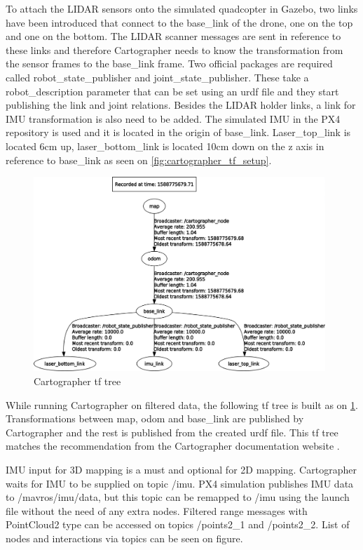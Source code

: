 To attach the LIDAR sensors onto the simulated quadcopter in Gazebo, two links have been introduced that
connect to the base\_link of the drone, one on the top and one on the bottom. The LIDAR scanner messages 
are sent in reference to these links and therefore Cartographer needs to know the transformation from the
sensor frames to the base\_link frame. Two official packages are required called robot\_state\_publisher
and joint\_state\_publisher. These take a robot\_description parameter that can be set using an urdf file 
and they start publishing the link and joint relations. Besides the LIDAR holder links, a link for IMU 
transformation is also need to be added. The simulated IMU in the PX4 repository is used and it is located in 
the origin of base\_link. Laser\_top\_link is located 6cm up, laser\_bottom\_link is located 10cm down
on the z axis in reference to base\_link as seen on \ref{fig:cartographer_tf_setup}.

\begin{figure}[!ht]
    \centering
    \includegraphics[width=110mm, keepaspectratio]{figures/cartographer_tf_tree.png}
    \caption{Cartographer tf tree}
    \label{fig:cartographer_tf_tree}
\end{figure}


While running Cartographer on filtered data, the following tf tree is built as on \ref{fig:cartographer_tf_tree}.
Transformations between map, odom and base\_link are published by Cartographer and the rest is published 
from the created urdf file. This tf tree matches the recommendation from the Cartographer documentation
website \cite{CartographerDocumentation}.

IMU input for 3D mapping is a must and optional for 2D mapping. Cartographer waits for IMU to be supplied 
on topic /imu. PX4 simulation publishes IMU data to /mavros/imu/data, but this topic can be remapped to /imu
using the launch file without the need of any extra nodes. Filtered range messages with PointCloud2 type 
can be accessed on topics /points2\_1 and /points2\_2. List of nodes and interactions via topics can be 
seen on figure.

